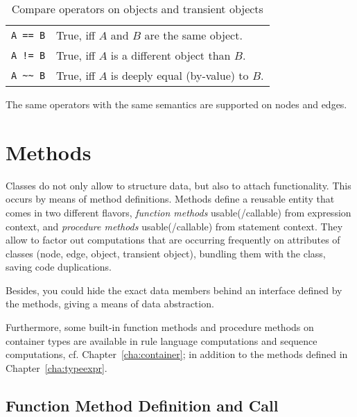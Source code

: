 \begin{table}[htbp]
  \centering
  \begin{tabularx}{\linewidth}{|l|X|}
    \hline
    \texttt{A == B} & True, iff $A$ and $B$ are the same object. \\
    \texttt{A != B} & True, iff $A$ is a different object than $B$. \\
    \texttt{A \textasciitilde\textasciitilde\ B} & True, iff $A$ is deeply equal (by-value) to $B$. \\
    \hline
  \end{tabularx}
  \caption{Compare operators on objects and transient objects}
  \label{compandarithmetic}
\end{table}

The same operators with the same semantics are supported on nodes and edges.


\section{Methods}\label{sec:objectoriented}

Classes do not only allow to structure data, but also to attach functionality.
This occurs by means of method definitions.
Methods define a reusable entity that comes in two different flavors, \emph{function methods} usable(/callable) from expression context, and \emph{procedure methods} usable(/callable) from statement context.
They allow to factor out computations that are occurring frequently on attributes of classes (node, edge, object, transient object), bundling them with the class, saving code duplications. 

Besides, you could hide the exact data members behind an interface defined by the methods, giving a means of data abstraction.

Furthermore, some built-in function methods and procedure methods on container types are available in rule language computations and sequence computations, cf. Chapter~\ref{cha:container};
in addition to the methods defined in Chapter~\ref{cha:typeexpr}.

\subsection{Function Method Definition and Call}\label{sub:functionmethods}\label{sec:funcmethcall} 

